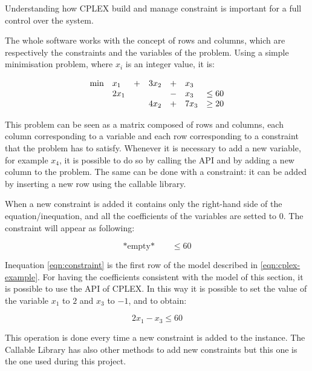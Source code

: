 Understanding how CPLEX build and manage constraint is important for a full control over the system. 

The whole software works with the concept of rows and columns, which are respectively the constraints and the variables of the problem. Using a simple minimisation problem, where $x_i$ is an integer value, it is:

\begin{equation}
\label{eqn:cplex-example}
\begin{array}{lllllll}%
\text{min}  &x_1 	&+ 	& 3x_2 &+ & x_3\\
&  2x_1 &  	&   &- &x_3 &\le 60\\
&		&	& 4x_2 & + &7x_3 &\ge 20\\
\end{array}\\
\end{equation}

This problem can be seen as a matrix composed of rows and columns, each column corresponding to a variable and each row corresponding to a constraint that the problem has to satisfy. Whenever it is necessary to add a new variable, for example $x_4$, it is possible to do so by calling the API and by adding a new column to the problem. The same can be done with a constraint: it can be added by inserting a new row using the callable library.

When a new constraint is added it contains only the right-hand side of the equation/inequation, and all the coefficients of the variables are setted to 0. The constraint will appear as following:

\begin{equation}
\label{eqn:constraint}
\text{*empty*} \qquad \le 60
\end{equation}

Inequation \ref{eqn:constraint} is the first row of the model described in \ref{eqn:cplex-example}.
For having the coefficients consistent with the model of this section, it is possible to use the API of CPLEX. In this way it is possible to set the value of the variable $x_1$ to $2$ and $x_3$ to $-1$, and to obtain: 

\begin{equation}
\label{eqn:full-constraint}
2x_1-x_3 \le 60
\end{equation}

This operation is done every time a new constraint is added to the instance.
The Callable Library has also other methods to add new constraints but this one is the one used during this project.